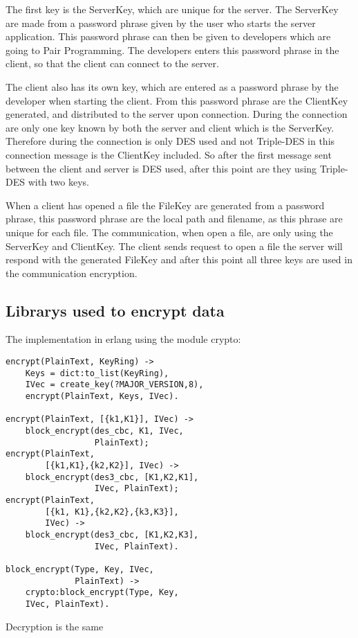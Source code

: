 The first key is the ServerKey, which are unique for the server. The ServerKey are made from a password phrase given by the user who starts the server application. This password phrase can then be given to developers which are going to Pair Programming. The developers enters this password phrase in the client, so that the client can connect to the server. 

The client also has its own key, which are entered as a password phrase by the developer when starting the client. From this password phrase are the ClientKey generated, and distributed to the server upon connection. During the connection are only one key known by both the server and client which is the ServerKey. Therefore during the connection is only DES used and not Triple-DES in this connection message is the ClientKey included. So after the first message sent between the client and server is DES used, after this point are they using Triple-DES with two keys. 

When a client has opened a file the FileKey are generated from a password phrase, this password phrase are the local path and filename, as this phrase are unique for each file. The communication, when open a file, are only using the ServerKey and ClientKey. The client sends request to open a file the server will respond with the generated FileKey and after this point all three keys are used in the communication encryption. 


\subsection{Librarys used to encrypt data}

The implementation in erlang using the module crypto:

\begin{lstlisting}[frame=single]
encrypt(PlainText, KeyRing) ->
    Keys = dict:to_list(KeyRing),
    IVec = create_key(?MAJOR_VERSION,8),
    encrypt(PlainText, Keys, IVec).

encrypt(PlainText, [{k1,K1}], IVec) ->
    block_encrypt(des_cbc, K1, IVec, 
                  PlainText);
encrypt(PlainText, 
        [{k1,K1},{k2,K2}], IVec) ->
    block_encrypt(des3_cbc, [K1,K2,K1], 
                  IVec, PlainText);
encrypt(PlainText, 
        [{k1, K1},{k2,K2},{k3,K3}], 
        IVec) ->
    block_encrypt(des3_cbc, [K1,K2,K3], 
                  IVec, PlainText).
    
block_encrypt(Type, Key, IVec, 
              PlainText) ->
    crypto:block_encrypt(Type, Key, 
    IVec, PlainText).
\end{lstlisting}
Decryption is the same 

